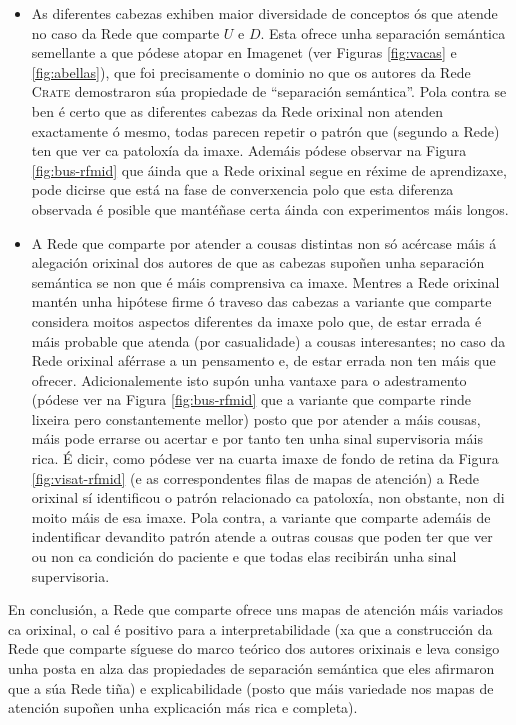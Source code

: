\begin{itemize}
				\item As diferentes cabezas exhiben maior diversidade de conceptos ós que atende no caso da Rede que comparte $U$ e $D$. Esta ofrece unha separación semántica semellante a que pódese atopar en Imagenet (ver Figuras \ref{fig:vacas} e \ref{fig:abellas}), que foi precisamente o dominio no que os autores da Rede \textsc{Crate} demostraron súa propiedade de ``separación semántica''. Pola contra se ben é certo que as diferentes cabezas da Rede orixinal non atenden exactamente ó mesmo, todas parecen repetir o patrón que (segundo a Rede) ten que ver ca patoloxía da imaxe. Ademáis pódese observar na Figura \ref{fig:bus-rfmid} que áinda que a Rede orixinal segue en réxime de aprendizaxe, pode dicirse que está na fase de converxencia polo que esta diferenza observada é posible que mantéñase certa áinda con experimentos máis longos.
				\item A Rede que comparte por atender a cousas distintas non só acércase máis á alegación orixinal dos autores de que as cabezas supoñen unha separación semántica \cite{crate} se non que é máis comprensiva ca imaxe. Mentres a Rede orixinal mantén unha hipótese firme ó traveso das cabezas a variante que comparte considera moitos aspectos diferentes da imaxe polo que, de estar errada é máis probable que atenda (por casualidade) a cousas interesantes; no caso da Rede orixinal aférrase a un pensamento e, de estar errada non ten máis que ofrecer. Adicionalemente isto supón unha vantaxe para o adestramento (pódese ver na Figura \ref{fig:bus-rfmid} que a variante que comparte rinde lixeira pero constantemente mellor) posto que por atender a máis cousas, máis pode errarse ou acertar e por tanto ten unha sinal supervisoria máis rica. É dicir, como pódese ver na cuarta imaxe de fondo de retina da Figura \ref{fig:visat-rfmid} (e as correspondentes filas de mapas de atención) a Rede orixinal sí identificou o patrón relacionado ca patoloxía, non obstante, non di moito máis de esa imaxe. Pola contra, a variante que comparte ademáis de indentificar devandito patrón atende a outras cousas que poden ter que ver ou non ca condición do paciente e que todas elas recibirán unha sinal supervisoria.
\end{itemize}

En conclusión, a Rede que comparte ofrece uns mapas de atención máis variados ca orixinal, o cal é positivo para a \gls{interpretabilidade} (xa que a construcción da Rede que comparte síguese do marco teórico dos autores orixinais \cite{crate} e leva consigo unha posta en alza das propiedades de separación semántica que eles afirmaron que a súa Rede tiña) e \gls{explicabilidade} (posto que máis variedade nos mapas de atención supoñen unha explicación más rica e completa).

